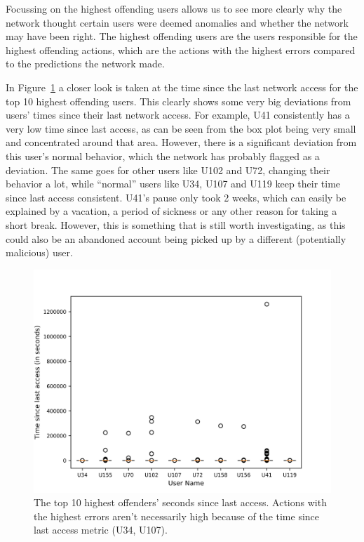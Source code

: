 Focussing on the highest offending users allows us to see more clearly why the network thought certain users were deemed anomalies and whether the network may have been right. The highest offending users are the users responsible for the highest offending actions, which are the actions with the highest errors compared to the predictions the network made.

In Figure~\ref{fig:time_since_last_access} a closer look is taken at the time since the last network access for the top 10 highest offending users. This clearly shows some very big deviations from users' times since their last network access. For example, U41 consistently has a very low time since last access, as can be seen from the box plot being very small and concentrated around that area. However, there is a significant deviation from this user's normal behavior, which the network has probably flagged as a deviation. The same goes for other users like U102 and U72, changing their behavior a lot, while \enquote{normal} users like U34, U107 and U119 keep their time since last access consistent. U41's pause only took 2 weeks, which can easily be explained by a vacation, a period of sickness or any other reason for taking a short break. However, this is something that is still worth investigating, as this could also be an abandoned account being picked up by a different (potentially malicious) user.

\begin{figure}
	\begin{center}
		\includegraphics[scale=1.6]{results/highest_offender_time_since_last_access}
	\end{center}
	\caption{The top 10 highest offenders' seconds since last access. Actions with the highest errors aren't necessarily high because of the time since last access metric (U34, U107).~\label{fig:time_since_last_access}}
\end{figure}

